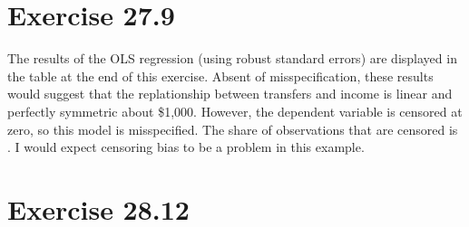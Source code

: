 \documentclass{article}
\begin{document}

\section*{Exercise 27.9}

The results of the OLS regression (using robust standard errors) are displayed in the table at the end of this exercise. Absent of misspecification, these results would suggest that the replationship between transfers and income is linear and perfectly symmetric about \$1,000. However, the dependent variable is censored at zero, so this model is misspecified. The share of observations that are censored is . I would expect censoring bias to be a problem in this example.

\begin{center}
	
\end{center}

\section*{Exercise 28.12}


\end{document}
